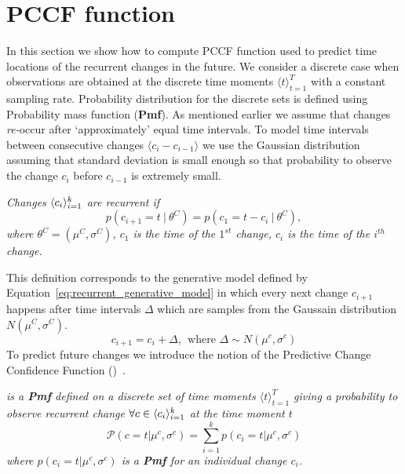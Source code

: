 \section{PCCF function}
\label{sec:pccf}
In this section we show how to compute PCCF function used to predict time locations of the recurrent changes in the future.
We consider a discrete case when observations are obtained at the
discrete time moments $\langle t \rangle_{t=1}^T$ with a constant sampling rate.
%
Probability distribution for the discrete sets is defined using
Probability mass function (\textbf{Pmf}).
As mentioned earlier we assume that changes \textit{re-}occur after
`approximately' equal time intervals.
To model time intervals between consecutive changes
$\langle c_i - c_{i-1} \rangle$
we use the Gaussian distribution assuming that standard deviation is small enough so that probability to observe the change $c_i$ before $c_{i-1}$ is extremely small.
\begin{definition}
    \label{def:recurrentdefinition}
    \textit{
        Changes $\langle c_i \rangle_{i=1}^k$ are recurrent if
    }
    \begin{equation}
        p(c_{i+1} = t \: | \: \theta^C) = p(c_1 = t - c_{i} \: | \: \theta^C),
        \label{eq:procnorefs}
    \end{equation}
    \textit{
        where
        $\theta^C=(\mu^C,\sigma^C)$,
        $c_1$ is the time of the $1^{st}$ change,
        $c_i$ is the time of the $i^{th}$ change.
    }
\end{definition}
%
This definition corresponds to the generative model defined by
Equation~\ref{eq:recurrent_generative_model} in which every next
change $c_{i+1}$ happens after time intervals $\Delta$ which are
samples from the Gaussain distribution $N(\mu^C, \sigma^C)$.
\begin{equation}
    c_{i+1} = c_i + \Delta,~~\text{where } \Delta \sim N(\mu^c, \sigma^c)
    \label{eq:recurrent_generative_model}
\end{equation}
%
To predict future changes we introduce the notion of the
Predictive Change Confidence Function (\PCCF)~\cite{MaslovSDM2016}.
\begin{definition}
    \label{def:pccf_definition}
    \textit{
        \PCCF is a \textbf{Pmf} defined on a discrete set of time moments
        $\langle t \rangle_{t=1}^T$ giving a probability
        to observe recurrent change $\forall c \in \langle  c_i  \rangle_{i=1}^k$
        at the time moment $t$
    }
    \begin{equation}
        \mathcal{P}(c=t|\mu^c,\sigma^c)=\sum_{i=1}^{k} p(c_i=t|\mu^c,\sigma^c)
    \end{equation}
    \textit{
        where $p(c_i=t|\mu^c,\sigma^c)$ is a \textbf{Pmf} for an
        individual change $c_i$.
    }
\end{definition}
